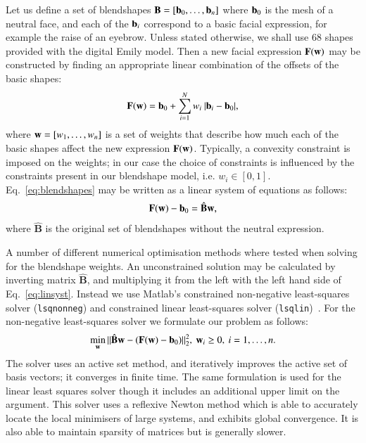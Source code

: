 Let us define a set of blendshapes $\mathbf{B} = [\mathbf{b}_0, \ldots, \mathbf{b}_n]$ where $\mathbf{b}_0$ is the mesh of a neutral face, and each of the $\mathbf{b}_i$ correspond to a basic facial expression, for example the raise of an eyebrow. Unless stated otherwise, we shall use $68$ shapes provided with the digital Emily model. Then a new facial expression $\mathbf{F(\mathbf{w})}$ may be constructed by finding an appropriate linear combination of the offsets of the basic shapes:
\begin{equation}
	\mathbf{F}(\mathbf{w}) = \mathbf{b}_0 + \sum_{i=1}^N w_i \: |\mathbf{b}_i - \mathbf{b}_0|, \label{eq:blendshapes}
\end{equation} where $\mathbf{w} = [w_1, \ldots, w_n]$ is a set of weights that describe how much each of the basic shapes affect the new expression $\mathbf{F(\mathbf{w})}$. Typically, a convexity constraint is imposed on the weights; in our case the choice of constraints is influenced by the constraints present in our blendshape model, i.e. $w_i \in [0,1]$. Eq.~\ref{eq:blendshapes} may be written as a linear system of equations as follows:
\begin{equation}
	\mathbf{F}(\mathbf{w}) - \mathbf{b}_0 = \hat{\mathbf{B}} \mathbf{w}, \label{eq:linsyst}
\end{equation} where $\hat{\mathbf{B}}$ is the original set of blendshapes without the neutral expression. 

A number of different numerical optimisation methods where tested when solving for the blendshape weights. An unconstrained solution may be calculated by inverting matrix $\hat{\mathbf{B}}$, and multiplying it from the left with the left hand side of Eq.~\ref{eq:linsyst}. Instead we use Matlab's constrained non-negative least-squares solver (\texttt{lsqnonneg}) and constrained linear least-squares solver (\texttt{lsqlin})~\cite{Matlab}. For the non-negative least-squares solver we formulate our problem as follows:
\begin{equation}
	\min_{\mathbf{w}} \| \hat{\mathbf{B}} \mathbf{w} - (\mathbf{F}(\mathbf{w}) - \mathbf{b}_0) \|_2^2, \: \mathbf{w}_i \geq 0, \: i = 1, \ldots, n. \label{eq:lsqnonneg}
\end{equation} The solver uses an active set method, and iteratively improves the active set of basis vectors; it converges in finite time. The same formulation is used for the linear least squares solver though it includes an additional upper limit on the argument. This solver uses a reflexive Newton method which is able to accurately locate the local minimisers of large systems, and exhibits global convergence. It is also able to maintain sparsity of matrices but is generally slower.

